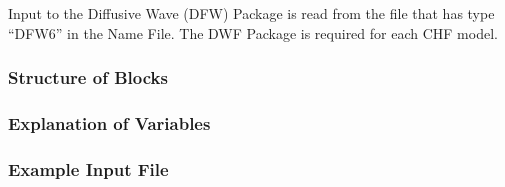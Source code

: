 Input to the Diffusive Wave (DFW) Package is read from the file that has type ``DFW6'' in the Name File.  The DWF Package is required for each CHF model. 

\vspace{5mm}
\subsubsection{Structure of Blocks}



\vspace{5mm}
\subsubsection{Explanation of Variables}
\begin{description}

\end{description}

\vspace{5mm}
\subsubsection{Example Input File}


